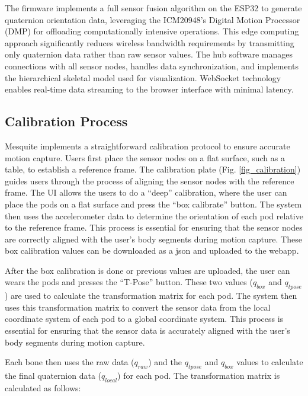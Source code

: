 \documentclass[lettersize,journal]{IEEEtran}
\begin{document}
The firmware implements a full sensor fusion algorithm on the ESP32 to generate quaternion orientation data, leveraging the ICM20948's Digital Motion Processor (DMP) for offloading computationally intensive operations. This edge computing approach significantly reduces wireless bandwidth requirements by transmitting only quaternion data rather than raw sensor values.
The hub software manages connections with all sensor nodes, handles data synchronization, and implements the hierarchical skeletal model used for visualization. WebSocket technology enables real-time data streaming to the browser interface with minimal latency.


\subsection{Calibration Process}

Mesquite implements a straightforward calibration protocol to ensure accurate motion capture. Users first place the sensor nodes on a flat surface, such as a table, to establish a reference frame. The calibration plate (Fig. \ref{fig_calibration}) guides users through the process of aligning the sensor nodes with the reference frame. The UI allows the users to do a ``deep'' calibration, where the user can place the pods on a flat surface and press the ``box calibrate'' button. The system then uses the accelerometer data to determine the orientation of each pod relative to the reference frame. This process is essential for ensuring that the sensor nodes are correctly aligned with the user's body segments during motion capture. These box calibration values can be downloaded as a json and uploaded to the webapp. 

After the box calibration is done or previous values are uploaded, the user can wears the pods and presses the ``T-Pose'' button. These two values ($q_{box}$ and $q_{tpose}$) are used to calculate the transformation matrix for each pod. The system then uses this transformation matrix to convert the sensor data from the local coordinate system of each pod to a global coordinate system. This process is essential for ensuring that the sensor data is accurately aligned with the user's body segments during motion capture.

Each bone then uses the raw data ($q_{raw}$) and the ${q_{tpose}}$ and $q_{box}$ values to calculate the final quaternion data ($q_{local}$) for each pod. The transformation matrix is calculated as follows:
\end{document}
